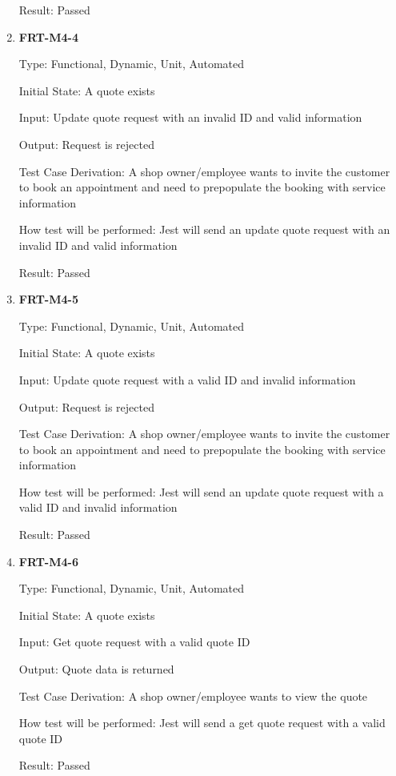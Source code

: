 \documentclass[12pt, titlepage]{article}
\begin{document}
\begin{enumerate}
	      Result: Passed

	\item \textbf{FRT-M4-4}

	      Type: Functional, Dynamic, Unit, Automated

	      Initial State: A quote exists

	      Input: Update quote request with an invalid ID and valid information

	      Output: Request is rejected

	      Test Case Derivation: A shop owner/employee wants to invite the customer to book an appointment and
	      need to prepopulate the booking with service information

	      How test will be performed: Jest will send an update quote request with an invalid ID and valid
	      information

	      Result: Passed

	\item \textbf{FRT-M4-5}

	      Type: Functional, Dynamic, Unit, Automated

	      Initial State: A quote exists

	      Input: Update quote request with a valid ID and invalid information

	      Output: Request is rejected

	      Test Case Derivation: A shop owner/employee wants to invite the customer to book an appointment and
	      need to prepopulate the booking with service information

	      How test will be performed: Jest will send an update quote request with a valid ID and invalid
	      information

	      Result: Passed

	\item \textbf{FRT-M4-6}

	      Type: Functional, Dynamic, Unit, Automated

	      Initial State: A quote exists

	      Input: Get quote request with a valid quote ID

	      Output: Quote data is returned

	      Test Case Derivation: A shop owner/employee wants to view the quote

	      How test will be performed: Jest will send a get quote request with a valid quote ID

	      Result: Passed


\end{enumerate}
\end{document}
